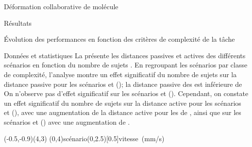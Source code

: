 \documentclass[myfrancais,ngerman,english,french]{mythesis}
\begin{document}
\begin{mychapter}{Déformation collaborative de molécule}
\begin{mysection}{Résultats}
\begin{mysubsection}{Évolution des performances en fonction des critères de complexité de la tâche}
\begin{mysubsubsection}{Données et statistiques}
					La  présente les distances passives  et actives  des différents scénarios  en fonction du nombre de sujets .
					En regroupant les scénarios par classe de complexité, l'analyse montre un effet significatif du nombre de sujets  sur la distance passive  pour les scénarios  et  (); la distance passive des  est inférieure de 
					On n'observe pas d'effet significatif sur les scénarios  et  ().
					Cependant, on constate un effet significatif du nombre de sujets  sur la distance active  pour les scénarios  et  (), avec une augmentation de la distance active pour les  de , ainsi que sur les scénarios  et  () avec une augmentation de .

					\begin{myfigure}
						\begin{myps}(-0.5,-0.9)(4,3)
							\myaxes(0,4){scénario}(0,2.5)[0.5]{vitesse~(mm/s)}
						\end{myps}
					\end{myfigure}


\end{mysubsubsection}
\end{mysubsection}
\end{mysection}
\end{mychapter}
\end{document}

